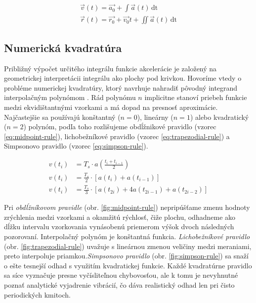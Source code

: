 \begin{ceqn}\begin{align}
   \vec{v}(t) = \vec{a_0} + \int{\vec{a}(t)\,\mathrm{dt}} \\
   \vec{r}(t) = \vec{r_0} + \vec{v_0}t + \iint{\vec{a}(t)\,\mathrm{dt}}
\end{align}\end{ceqn}

\subsection{Numerická kvadratúra}
Približný výpočet určitého integrálu funkcie akcelerácie je založený na geometrickej interpretácii integrálu ako plochy pod krivkou.
Hovoríme vtedy o probléme numerickej kvadratúry, ktorý navrhuje nahradiť pôvodný integrand interpolačným polynómom 
\cite{numerical-mathematics}. Rád polynómu $n$ implicitne stanoví priebeh funkcie medzi ekvidištantnými vzorkami a 
má dopad na presnosť aproximácie. Najčastejšie sa používajú konštantný ($n = 0$), lineárny ($n = 1$) alebo kvadratický ($n = 2$) 
polynóm, podľa toho rozlišujeme obdĺžnikové pravidlo (vzorec \ref{eq:midpoint-rule}),
lichobežníkové pravidlo (vzorec \ref{eq:trapezodial-rule}) a Simpsonovo pravidlo (vzorec \ref{eq:simpson-rule}).

\begin{ceqn}
\begin{align}
   v(t_i) &= T_s \cdot a\left(\frac{t_i + t_{i-1}}{2}\right)  \label{eq:midpoint-rule} \\
   v(t_i) &= \frac{T_s}{2} \cdot [a(t_i) + a(t_{i-1})]		\label{eq:trapezodial-rule} \\
   v(t_i) &= \frac{T_s}{3} \cdot [a(t_{2i}) + 4a(t_{2i - 1}) + a(t_{2i - 2})] \label{eq:simpson-rule}
\end{align}
\end{ceqn}

Pri \emph{obdĺžníkovom pravidle} (obr. \ref{fig:midpoint-rule}) nepripúšťame zmenu hodnoty zrýchlenia medzi vzorkami a okamžitú 
rýchlosť, čiže plochu, odhadneme ako dĺžku intervalu vzorkovania vynásobenú priemerom výšok dvoch následných pozorovaní. Interpolačný 
polynóm je konštantná funkcia. \emph{Lichobežníkové pravidlo} (obr. \ref{fig:trapezodial-rule}) uvažuje s lineárnou zmenou veličiny 
medzi meraniami, preto interpoluje priamkou.\emph{Simpsonovo pravidlo} (obr. \ref{fig:simpson-rule}) sa snaží o ešte tesnejší odhad s 
využitím kvadratickej funkcie. Každé kvadratúrne pravidlo sa síce vyznačuje presne vyčísliteľnou chybovosťou, ale k tomu je nevyhnutné 
poznať analytické vyjadrenie vibrácií, čo dáva realistický odhad len pri čisto periodických kmitoch.

